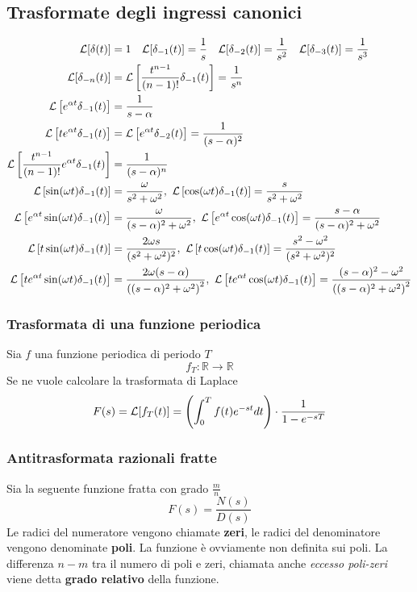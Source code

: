 \subsection{Trasformate degli ingressi canonici}
$$\begin{aligned}
\mathcal{L}[\delta(t)] &= 1 \quad
\mathcal{L}[\delta_{-1}(t)] = \frac{1}{s}\quad
\mathcal{L}[\delta_{-2}(t)] = \frac{1}{s^2}\quad
\mathcal{L}[\delta_{-3}(t)] = \frac{1}{s^3} \\
\mathcal{L}[\delta_{-n}(t)] &= \mathcal{L}\left[\frac{t^{n-1}}{(n-1)!}\delta_{-1}(t)\right] =
\frac{1}{s^n}\\
\mathcal{L}\left[e^{\alpha t}\delta_{-1}(t)\right] &= \frac{1}{s-\alpha}\\
\mathcal{L}\left[te^{\alpha t}\delta_{-1}(t)\right] &=
\mathcal{L} \left[e^{\alpha t}\delta_{-2}(t)\right] =
\frac{1}{(s-\alpha)^2}\\
\mathcal{L}\left[\frac{t^{n-1}}{(n-1)!}e^{\alpha t} \delta_{-1}(t)\right] &=
\frac{1}{(s-\alpha)^n} \\
\mathcal{L}\left[\sin(\omega t)\delta_{-1}(t)\right] &= \frac{\omega}{s^2+\omega^2},\
\mathcal{L}\left[\cos(\omega t)\delta_{-1}(t)\right] = \frac{s}{s^2+\omega^2}\\
\mathcal{L}\left[e^{\alpha t}\sin(\omega t) \delta_{-1}(t)\right] &=
\frac{\omega}{(s-\alpha)^2+\omega^2},\ \mathcal{L}\left[e^{\alpha t}\cos(\omega
t)\delta_{-1}(t)\right] = \frac{s-\alpha}{(s-\alpha)^2+\omega^2}\\
\mathcal{L}\left[t\sin(\omega t)\delta_{-1}(t)\right] & = \frac{2\omega
s}{(s^2+\omega^2)^2},\  \mathcal{L}\left[t\cos(\omega t)\delta_{-1}(t)\right] =
\frac{s^2-\omega^2}{(s^2+\omega^2)^2}\\
\mathcal{L}\left[te^{\alpha t}\sin(\omega t) \delta_{-1}(t)\right] & =
\frac{2\omega(s-\alpha)}{\left((s-\alpha)^2+\omega^2\right)^2},\
\mathcal{L}\left[te^{\alpha t}\cos(\omega t) \delta_{-1}(t)\right] =
\frac{(s-\alpha)^2-\omega^2}{\left((s-\alpha)^2+\omega^2\right)^2}
\end{aligned}
$$

\subsubsection{Trasformata di una funzione periodica}
Sia $f$ una funzione periodica di periodo $T$
$$
f_T: \mathbb{R}\to\mathbb{R}
$$
Se ne vuole calcolare la trasformata di Laplace
$$
F(s) = \mathcal{L}[f_T(t)] = \left(\int_0^Tf(t)e^{-st}dt\right)\cdot\frac{1}{1-e^{-sT}}
$$

\subsubsection{Antitrasformata razionali fratte}
Sia la seguente funzione fratta con grado $\frac{m}{n}$
$$
F(s) = \frac{N(s)}{D(s)}
$$
Le radici del numeratore vengono chiamate \textbf{zeri}, le radici del
denominatore vengono denominate \textbf{poli}. La funzione è ovviamente non
definita sui poli.
La differenza $n-m$ tra il numero di poli e zeri, chiamata anche \textit{eccesso
poli-zeri} viene detta \textbf{grado relativo} della funzione.

